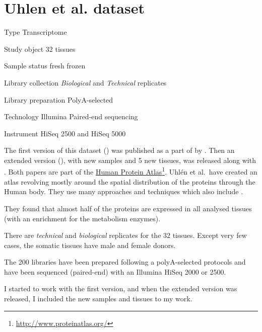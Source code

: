 \section{Uhlen et al. dataset}
\label{ch:uhlenData}

\begin{eqlist}
    \item[Type] Transcriptome
    \item[Study object] 32 tissues
    \item[Sample status] fresh frozen
    \item[Library collection] \emph{Biological} and \emph{Technical} replicates
    \item[Library preparation] PolyA-selected
    \item[Technology] Illumina Paired-end sequencing
    \item[Instrument] HiSeq 2500 and HiSeq 5000
\end{eqlist}


The first version of this dataset () was published
as a part of  by \citet{Uhlen2014}. Then an extended
version (), with new samples and 5 new tissues,
was released along with  \citep{Uhlen2015}.
Both papers are part of the
\href{http://www.proteinatlas.org/}{Human Protein Atlas}\footnote{%
\href{http://www.proteinatlas.org/}{http://www.proteinatlas.org/}}.
Uhlén et al.\ have created
an atlas revolving mostly around the spatial distribution of the proteins through
the Human body. They use many approaches and techniques which also include \Rnaseq.

They found that almost half of the proteins are expressed in all analysed tissues
(with an enrichment for the metabolism enzymes).

There are \emph{technical} and \emph{biological} replicates for the 32 tissues.
Except very few cases, the somatic tissues have male and female donors.

The 200 libraries have been prepared following a polyA-selected protocols and
have been sequenced (paired-end) with an Illumina HiSeq 2000 or 2500.

I started to work with the first version, and when the extended version was
released, I included the new samples and tissues to my work.

\clearpage

